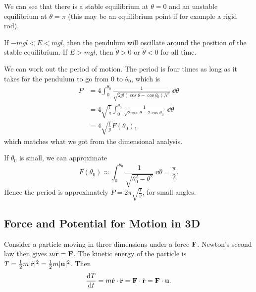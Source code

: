 \documentclass[a4paper]{scrartcl}
\newcommand{\newsection}{\subsection}
\begin{document}
\begin{example}[Pendulum]
	We can see that there is a stable equilibrium at $\theta = 0$ and an unstable equilibrium at $\theta = \pi$ (this may be an equilibrium point if for example a rigid rod).

	If $-mgl < E < mgl$, then the pendulum will oscillate around the position of the stable equilibrium. If $E > mgl$, then $\dot{\theta} > 0$ or $\dot{\theta} < 0$ for all time.

	We can work out the period of motion. The period is four times as long as it takes for the pendulum to go from 0 to $\theta_0$, which is
	\begin{align*}
		P &= 4 \int_0^{\theta_0} \frac{1}{\sqrt{2gl(\cos \theta - \cos \theta_0)/l^2}} \; \dd \theta \\
		&= 4 \sqrt{\frac{l}{g}} \int_0^{\theta_0} \frac{1}{\sqrt{2 \cos \theta - 2 \cos \theta_0}} \; \dd \theta \\
		&= 4 \sqrt{\frac{l}{g}} F(\theta_0),
	\end{align*}
	which matches what we got from the dimensional analysis.

	If $\theta_0$ is small, we can approximate
	$$
	F(\theta_0) \approx \int_0^{\theta_0} \frac{1}{\sqrt{\theta_0^2 - \theta^2}} \; \dd \theta = \frac{\pi}{2}.
	$$
	Hence the period is approximately $P = 2 \pi \sqrt{\frac{l}{g}}$, for small angles.
\end{example}

\newsection{Force and Potential for Motion in 3D}

Consider a particle moving in three dimensions under a force $\mathbf{F}$.
Newton's second law then gives $m \dot{\mathbf{r}} = \mathbf{F}$. The kinetic energy of the particle is $T = \frac{1}{2}m |\dot{\mathbf{r}}|^2 = \frac{1}{2}m |\mathbf{u}|^2$.
Then
$$
\frac{\mathrm{d} T}{\mathrm{d} t} = m \dot{\mathbf{r}} \cdot \ddot{\mathbf{r}} = \mathbf{F} \cdot \dot{\mathbf{r}} = \mathbf{F} \cdot \mathbf{u}.
$$
\end{document}
